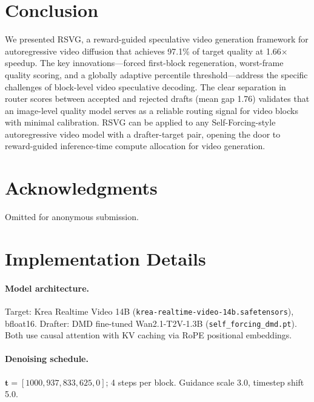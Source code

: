 \documentclass{article}
\begin{document}
\section{Conclusion}

We presented RSVG, a reward-guided speculative video generation framework
for autoregressive video diffusion that achieves 97.1\% of target quality
at 1.66$\times$ speedup.
The key innovations---forced first-block regeneration, worst-frame quality
scoring, and a globally adaptive percentile threshold---address the specific
challenges of block-level video speculative decoding.
The clear separation in router scores between accepted and rejected
drafts (mean gap 1.76) validates that an image-level quality model serves
as a reliable routing signal for video blocks with minimal calibration.
RSVG can be applied to any Self-Forcing-style autoregressive video
model with a drafter-target pair, opening the door to reward-guided
inference-time compute allocation for video generation.

\section*{Acknowledgments}
Omitted for anonymous submission.




\appendix
\section{Implementation Details}
\label{app:impl}

\paragraph{Model architecture.}
Target: Krea Realtime Video 14B (\texttt{krea-realtime-video-14b.safetensors}),
bfloat16.
Drafter: DMD fine-tuned Wan2.1-T2V-1.3B (\texttt{self\_forcing\_dmd.pt}).
Both use causal attention with KV caching via RoPE positional embeddings.

\paragraph{Denoising schedule.}
$\mathbf{t} = [1000, 937, 833, 625, 0]$; 4 steps per block.
Guidance scale 3.0, timestep shift 5.0.
\end{document}
